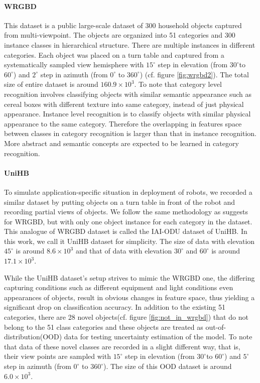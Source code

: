 \paragraph{WRGBD\cite{lai2011large}} This dataset is a public large-scale dataset of 300 household objects captured from multi-viewpoint. The objects are organized into 51 categories and 300 instance classes in hierarchical structure. There are multiple instances in different categories. Each object was placed on a turn table and captured from a systematically sampled view hemisphere with $15^{\circ}$ step in elevation (from $30^{\circ}$to $60^{\circ}$) and $2^\circ$ step in azimuth (from $0^\circ$ to $360^\circ$) (cf. figure \ref{fig:wrgbd2}). The total size of entire dataset is around $160.9\times10^3$. To note that category level recognition involves classifying objects with similar semantic appearance such as cereal boxes with different texture into same category, instead of just physical appearance. Instance level recognition is to classify objects with similar physical appearance to the same category. Therefore the overlapping in features space between classes in category recognition is larger than that in instance recognition. More abstract and semantic concepts are expected to be learned in category recognition.  

\paragraph{UniHB} To simulate application-specific situation in deployment of robots, we recorded a similar dataset by putting objects on a turn table in front of the robot and recording partial views of objects. We follow the same methodology as \cite{lai2011large} suggests for WRGBD, but with only one object instance for each category in the dataset. This analogue of WRGBD dataset is called the IAI-ODU dataset of UniHB. In this work, we call it UniHB dataset for simplicity. The size of data with elevation $45^\circ$ is around $8.6\times10^3$ and that of data with elevation $30^\circ$ and $60^\circ$ is around $17.1\times10^3$.

While the UniHB dataset's setup strives to mimic the WRGBD one, the differing capturing conditions such as different equipment and light conditions even appearances of objects, result in obvious changes in feature space, thus yielding a significant drop on classification accuracy. In addition to the existing 51 categories, there are 28 novel objects(cf. figure \ref{fig:not_in_wrgbd}) that do not belong to the 51 class categories and these objects are treated as out-of-distribution(OOD) data for testing uncertainty estimation of the model. To note that data of these novel classes are recorded in a slight different way, that is, their view points are sampled with $15^{\circ}$ step in elevation (from $30^{\circ}$to $60^{\circ}$) and $5^\circ$ step in azimuth (from $0^\circ$ to $360^\circ$). The size of this OOD dataset is around $6.0\times10^3$.

